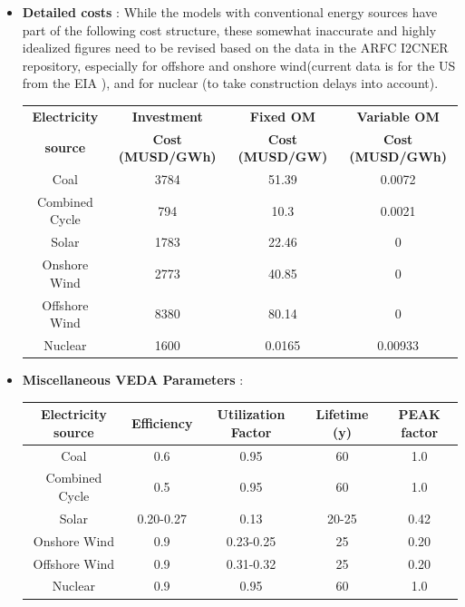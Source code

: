 \documentclass[14pt,a4paper]{article} %
\begin{document}
\begin{itemize}
\item \textbf{Detailed costs} \cite{noauthor_eia_2019} : While the models with conventional energy sources have part of the following cost structure, these somewhat inaccurate and highly idealized figures need to be revised based on the data in the \gls{ARFC} \gls{I2CNER} repository, especially for offshore and onshore wind(current data is for the US from the \gls{EIA} \cite{noauthor_eia_2019}), and for nuclear (to take construction delays into account).

\begin{tabular}{|c|c|c|c|}
\hline
\textbf{Electricity} & \textbf{Investment} & \textbf{Fixed \gls{OM}} & \textbf{Variable \gls{OM}}\\
\textbf{source} & \textbf{Cost (MUSD/GWh)} & \textbf{Cost (MUSD/GW)} & \textbf{Cost (MUSD/GWh)}\\
\hline
Coal & 3784 & 51.39 & 0.0072\\
\hline
Combined Cycle & 794 & 10.3 & 0.0021\\
\hline
Solar & 1783 & 22.46 & 0 \\
\hline
Onshore Wind & 2773 & 40.85 & 0\\
\hline
Offshore Wind & 8380 & 80.14 & 0\\
\hline
Nuclear & 1600 & 0.0165 & 0.00933\\
\hline
\end{tabular}

\item \textbf{Miscellaneous VEDA Parameters} \cite{kato_energy_2016,gargiulo_documentation_2005}:\\

\begin{tabular}{|c|c|c|c|c|}
\hline
\textbf{Electricity source} & \textbf{Efficiency} & \textbf{Utilization Factor} & \textbf{Lifetime (y)} & \textbf{\gls{PEAK} factor}\\
\hline
Coal & 0.6 & 0.95 & 60 & 1.0 \\
\hline
Combined Cycle & 0.5 & 0.95 & 60 & 1.0 \\
\hline
Solar & 0.20-0.27 & 0.13 & 20-25 & 0.42 \\
\hline
Onshore Wind & 0.9 & 0.23-0.25 & 25 & 0.20 \\
\hline
Offshore Wind & 0.9 & 0.31-0.32 & 25 & 0.20 \\
\hline
Nuclear & 0.9 & 0.95 & 60 & 1.0 \\
\hline
\end{tabular}

\end{itemize}
\end{document}
